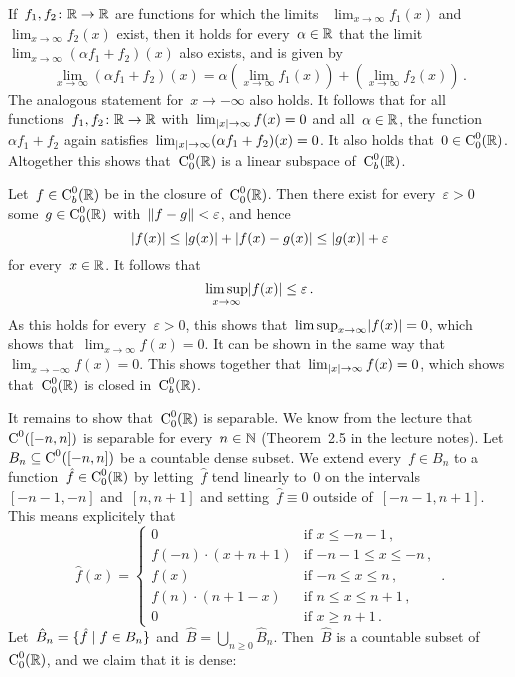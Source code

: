 If~$f_1, f_2 \colon \mathbb{R} \to \mathbb{R}$ are functions for which the limits
~$\lim_{x \to \infty} f_1(x)$ and~$\lim_{x \to \infty} f_2(x)$ exist, then it holds for every~$\alpha \in \mathbb{R}$ that the limit~$\lim_{x \to \infty} (\alpha f_1 + f_2)(x)$ also exists, and is given by
\[
    \lim_{x \to \infty} (\alpha f_1 + f_2)(x)
  =   \alpha \left( \lim_{x \to \infty} f_1(x) \right)
    + \left( \lim_{x \to \infty} f_2(x) \right) \,.
\]
The analogous statement for~$x \to -\infty$ also holds.
It follows that for all functions~$f_1, f_2 \colon \mathbb{R} \to \mathbb{R}$ with~$\lim_{\lvert x\rvert \to \infty} f(x) = 0$ and all~$\alpha \in \mathbb{R}$, the function~$\alpha f_1 + f_2$ again satisfies~$\lim_{\lvert x\rvert \to \infty} (\alpha f_1 + f_2)(x) = 0$.
It also holds that~$0 \in \operatorname{C}^0_0(\mathbb{R})$.
Altogether this shows that~$\operatorname{C}^0_0(\mathbb{R})$ is a linear subspace of~$\operatorname{C}^0_b(\mathbb{R})$.

Let~$f \in \operatorname{C}^0_b(\mathbb{R})$ be in the closure of~$\operatorname{C}^0_0(\mathbb{R})$.
Then there exist for every~$\varepsilon > 0$ some~$g \in \operatorname{C}^0_0(\mathbb{R})$ with~$\lVert f-g\rVert < \varepsilon$, and hence
\[
        \lvert f(x)\rvert
  \leq  \lvert g(x)\rvert + \lvert f(x) - g(x) \rvert
  \leq  \lvert g(x) \rvert + \varepsilon
\]
for every~$x \in \mathbb{R}$.
It follows that
\[
        \limsup_{x \to \infty} \lvert f(x)\rvert
  \leq  \varepsilon \,.
\]
As this holds for every~$\varepsilon > 0$, this shows that~$\limsup_{x \to \infty} \lvert f(x) \rvert = 0$, which shows that~$\lim_{x \to \infty} f(x) = 0$.
It can be shown in the same way that~$\lim_{x \to -\infty} f(x) = 0$.
This shows together that~$\lim_{\lvert x\rvert \to \infty} f(x) = 0$, which shows that~$\operatorname{C}^0_0(\mathbb{R})$ is closed in~$\operatorname{C}^0_b(\mathbb{R})$.

It remains to show that~$\operatorname{C}^0_0(\mathbb{R})$ is separable.
We know from the lecture that~$\operatorname{C}^0([-n,n])$ is separable for every~$n \in \mathbb{N}$ (Theorem~2.5 in the lecture notes).
Let~$B_n \subseteq \operatorname{C}^0([-n,n])$ be a countable dense subset.
We extend every~$f \in B_n$ to a function~$\hat{f} \in \operatorname{C}^0_0(\mathbb{R})$ by letting~$\hat{f}$ tend linearly to~$0$ on the intervals~$[-n-1,-n]$ and~$[n,n+1]$ and setting~$\hat{f} \equiv 0$ outside of~$[-n-1,n+1]$.
This means explicitely that
\[
    \hat{f}(x)
  = \begin{cases}
      0                   & \text{if~$x \leq -n-1$} \,, \\
      f(-n) \cdot (x+n+1) & \text{if~$-n-1 \leq x \leq -n$} \,, \\
      f(x)                & \text{if~$-n \leq x \leq n$}  \,, \\
      f(n) \cdot  (n+1-x) & \text{if~$n \leq x \leq n+1$} \,, \\
      0                   & \text{if~$x \geq n+1$} \,.
    \end{cases} \,.
\]
Let~$\hat{B}_n = \{ \hat{f} \suchthat f \in B_n \}$ and~$\hat{B} = \bigcup_{n \geq 0} \hat{B}_n$.
Then~$\hat{B}$ is a countable subset of~$\operatorname{C}^0_0(\mathbb{R})$, and we claim that it is dense:

